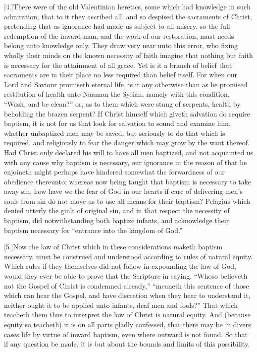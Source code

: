 [4.]There were of the old Valentinian heretics, some which had knowledge in such admiration, that to it they ascribed all, and so despised the sacraments of Christ, pretending that as ignorance had made us subject to all misery, so the full redemption of the inward man, and the work of our restoration, must needs belong unto knowledge only. They draw very near unto this error, who fixing wholly their minds on the known necessity of faith imagine that nothing but faith is necessary for the attainment of all grace. Yet is it a branch of belief that sacraments are in their place no less required than belief itself. For when our Lord and Saviour promiseth eternal life, is it any otherwise than as he promised restitution of health unto Naaman the Syrian, namely with  this condition, “Wash, and be clean?”
 or, as to them which were stung of serpents, health by beholding the brazen serpent? If Christ himself which giveth salvation do require baptism, it is not for us that look for salvation to sound and examine him, whether unbaptized men may be saved, but seriously to do that which is required, and religiously to fear the danger which may grow by the want thereof. Had Christ only declared his will to have all men baptized, and not acquainted us with any cause why baptism is necessary, our ignorance in the reason of that he enjoineth might perhaps have hindered somewhat the forwardness of our obedience thereunto; whereas now being taught that baptism is necessary to take away sin, how have we the fear of God in our hearts if care of delivering men’s souls from sin do not move us to use all means for their baptism? Pelagius which denied utterly the guilt of original sin, and in that respect the necessity of baptism, did notwithstanding both baptize infants, and acknowledge their baptism necessary for “entrance into the kingdom of God.”

[5.]Now the law of Christ which in these considerations maketh baptism necessary, must be construed and understood according to rules of natural equity. Which rules if they themselves did not follow in expounding the law of God, would they ever be able to prove that the Scripture in saying, “Whoso believeth not the Gospel of Christ is condemned already,” “meaneth this sentence of those which can hear the Gospel, and have discretion when they hear to understand it, neither ought it to be applied unto infants, deaf men and fools?” That which teacheth them  thus to interpret the law of Christ is natural equity. And (because equity so teacheth) it is on all parts gladly confessed, that there may be in divers cases life by virtue of inward baptism, even where outward is not found. So that if any question be made, it is but about the bounds and limits of this possibility.

